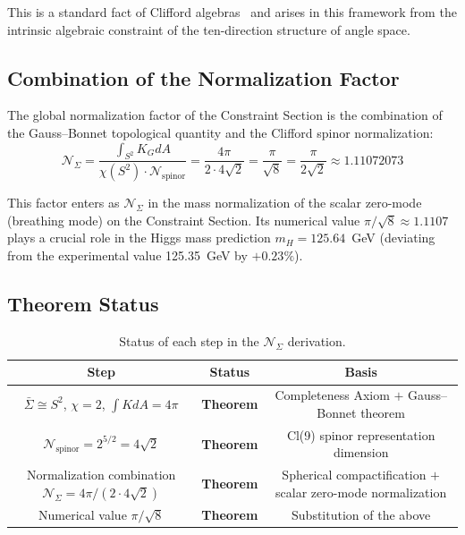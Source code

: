 \documentclass[aps,prd,reprint,nofootinbib]{revtex4-2}
\begin{document}
This is a standard fact of Clifford algebras~\cite{LawsonMichelsohn1989} and arises in this framework from the intrinsic algebraic constraint of the ten-direction structure of angle space.

\subsection{Combination of the Normalization Factor}

The global normalization factor of the Constraint Section is the combination of the Gauss--Bonnet topological quantity and the Clifford spinor normalization:
\begin{equation}
\boxed{\mathcal{N}_\Sigma = \frac{\int_{S^2} K_G dA}{\chi(S^2) \cdot \mathcal{N}_{\text{spinor}}} = \frac{4\pi}{2 \cdot 4\sqrt{2}} = \frac{\pi}{\sqrt{8}} = \frac{\pi}{2\sqrt{2}} \approx 1.11072073}
\end{equation}

This factor enters as $\mathcal{N}_\Sigma$ in the mass normalization of the scalar zero-mode (breathing mode) on the Constraint Section. Its numerical value $\pi/\sqrt{8} \approx 1.1107$ plays a crucial role in the Higgs mass prediction $m_H = 125.64$~GeV (deviating from the experimental value 125.35~GeV by $+0.23\%$).

\subsection{Theorem Status}

\begin{table}[h]
\caption{Status of each step in the $\mathcal{N}_\Sigma$ derivation.}
\label{tab:Nstatus}
\begin{ruledtabular}
\begin{tabular}{c c c}
\hline
Step & Status & Basis \\
\hline
$\bar{\Sigma} \cong S^2$, $\chi = 2$, $\int K dA = 4\pi$ & \textbf{Theorem} & Completeness Axiom $+$ Gauss--Bonnet theorem \\
$\mathcal{N}_{\text{spinor}} = 2^{5/2} = 4\sqrt{2}$ & \textbf{Theorem} & Cl(9) spinor representation dimension \\
Normalization combination $\mathcal{N}_\Sigma = 4\pi/(2 \cdot 4\sqrt{2})$ & \textbf{Theorem} & Spherical compactification $+$ scalar zero-mode normalization \\
Numerical value $\pi/\sqrt{8}$ & \textbf{Theorem} & Substitution of the above \\
\hline
\end{tabular}
\end{ruledtabular}
\end{table}
\end{document}
